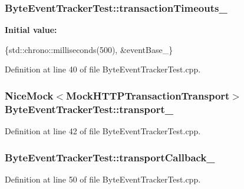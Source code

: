 \subsubsection[{transaction\+Timeouts\+\_\+}]{ Byte\+Event\+Tracker\+Test\+::transaction\+Timeouts\+\_\+\hspace{0.3cm}{\ttfamily [protected]}}\label{classByteEventTrackerTest_a6dbf6cabdc76968395daa871c96fa519}
{\bfseries Initial value\+:}
\begin{DoxyCode}
\{std::chrono::milliseconds(500),
      &eventBase_\}
\end{DoxyCode}


Definition at line 40 of file Byte\+Event\+Tracker\+Test.\+cpp.

\subsubsection[{transport\+\_\+}]{\setlength{\rightskip}{0pt plus 5cm}Nice\+Mock$<${\bf Mock\+H\+T\+T\+P\+Transaction\+Transport}$>$ Byte\+Event\+Tracker\+Test\+::transport\+\_\+\hspace{0.3cm}{\ttfamily [protected]}}\label{classByteEventTrackerTest_a5b7d70dbb9aa4ce97f2bd0f2dc102571}


Definition at line 42 of file Byte\+Event\+Tracker\+Test.\+cpp.

\subsubsection[{transport\+Callback\+\_\+}]{ Byte\+Event\+Tracker\+Test\+::transport\+Callback\+\_\+\hspace{0.3cm}{\ttfamily [protected]}}\label{classByteEventTrackerTest_a29bbc40f55eed805ac63dd413126c9f9}


Definition at line 50 of file Byte\+Event\+Tracker\+Test.\+cpp.

